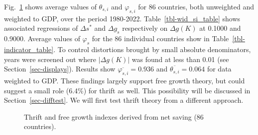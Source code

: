 \documentclass[a4paper,fleqn]{latex_styles/cas-sc}
\begin{document}
Fig.~\ref{fig-si_plots} shows average values of \(\theta_{s,i}\) and
\(\varphi_{s,i}\) for 86 countries, both unweighted and weighted to GDP,
over the period 1980-2022.
Table~\ref{tbl-wid_si_table} shows associated regressions of \(\Delta s^*\) and \(\Delta g_s\) respectively on \(\Delta g (K)\) at 0.1000 and 0.9000. Average values of \(\varphi_s\) for the 86 individual countries show in Table~\ref{tbl-indicator_table}.
To control distortions brought by small
absolute denominators, years were screened out where \(|\Delta g(K)|\)
was found at less than 0.01 (see Section~\ref{sec-displays}). Results show \(\overline{\varphi_{s,i}} = 0.936\) and \(\overline{\theta_{s,i}} = 0.064\) for data weighted to GDP. These findings largely support free growth theory, but could suggest a small role (6.4\%) for thrift as well. This possibility will be discussed in Section~\ref{sec-difftest}. We will first test thrift theory from a different approach.
%
\FloatBarrier
\begin{figure}[pos=H]
    \centering
    \quad %
    \captionsetup{justification=centering}
    \caption{Thrift and free growth indexes derived from net saving (86 countries).}
    \label{fig-si_plots}
\end{figure}
\end{document}
